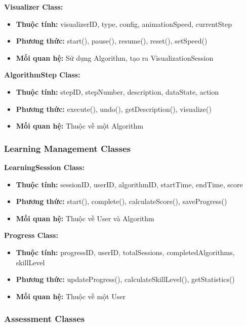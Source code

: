 \textbf{Visualizer Class:}
\begin{itemize}
    \item \textbf{Thuộc tính:} visualizerID, type, config, animationSpeed, currentStep
    \item \textbf{Phương thức:} start(), pause(), resume(), reset(), setSpeed()
    \item \textbf{Mối quan hệ:} Sử dụng Algorithm, tạo ra VisualizationSession
\end{itemize}

\textbf{AlgorithmStep Class:}
\begin{itemize}
    \item \textbf{Thuộc tính:} stepID, stepNumber, description, dataState, action
    \item \textbf{Phương thức:} execute(), undo(), getDescription(), visualize()
    \item \textbf{Mối quan hệ:} Thuộc về một Algorithm
\end{itemize}

\subsubsection{Learning Management Classes}

\textbf{LearningSession Class:}
\begin{itemize}
    \item \textbf{Thuộc tính:} sessionID, userID, algorithmID, startTime, endTime, score
    \item \textbf{Phương thức:} start(), complete(), calculateScore(), saveProgress()
    \item \textbf{Mối quan hệ:} Thuộc về User và Algorithm
\end{itemize}

\textbf{Progress Class:}
\begin{itemize}
    \item \textbf{Thuộc tính:} progressID, userID, totalSessions, completedAlgorithms, skillLevel
    \item \textbf{Phương thức:} updateProgress(), calculateSkillLevel(), getStatistics()
    \item \textbf{Mối quan hệ:} Thuộc về một User
\end{itemize}

\subsubsection{Assessment Classes}

